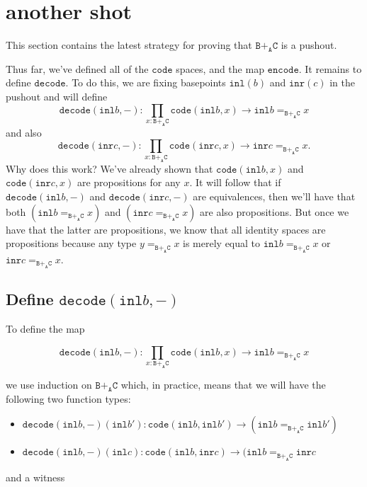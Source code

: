 \message{ !name(notes.tex)}\documentclass[12pt]{amsart}
\newcommand{\from}{\colon}
\newcommand{\type}[1]{\mathtt{#1}}
\newcommand{\tin}{\colon}
\newcommand{\A}{\type{A}}
\newcommand{\B}{\type{B}}
\newcommand{\C}{\type{C}}
\newcommand{\BAC}{\B +_{\A} \C}
\newcommand{\inl}{\type{inl}}
\newcommand{\inr}{\type{inr}}
\newcommand{\code}{\type{code}}
\newcommand{\encode}{\type{encode}}
\newcommand{\decode}{\type{decode}}
\theoremstyle{remark}
\theoremstyle{definition}
\begin{document}
\pagebreak


\section{another shot}

This section contains the latest strategy for proving that \( \BAC \)
is a pushout.

Thus far, we've defined all of the \( \code \) spaces, and the map \(
\encode \).  It remains to define \( \decode \). To do this, we are
fixing basepoints \( \inl (b) \) and \( \inr (c) \) in the pushout
and will define
\[
  \decode ( \inl b , - ) \from
  \prod\limits_{x \tin \BAC} \code ( \inl b , x ) \to
  \inl b =_{\BAC} x
\]
and also 
\[
  \decode ( \inr c , - ) \from
  \prod\limits_{x \tin \BAC} \code ( \inr c , x ) \to
  \inr c =_{\BAC} x.
\]
Why does this work?  We've already shown that \( \code ( \inl b , x ) \)
and \( \code ( \inr c , x ) \) are propositions for any \( x \).  It
will follow that if \( \decode (\inl b , - ) \) and
\( \decode ( \inr c , - ) \) are equivalences, then we'll have that
both \( (\inl b =_{\BAC} x ) \) and \( ( \inr c =_{\BAC} x ) \) are
also propositions. But once we have that the latter are propositions,
we know that all identity spaces are propositions because any type
\( y =_{\BAC} x \) is merely equal to \( \inl b =_{\BAC} x \) or
\( \inr c =_{\BAC} x \).

\subsection{Define $ \decode ( \inl b , - ) $} %

To define the map

\begin{equation} \label{eq:decode-b-blank}
  \decode ( \inl b , - )
  \from
  \prod\limits_{x \tin \BAC} \code ( \inl b , x )
  \to
  \inl b =_{\BAC} x
\end{equation}

we use induction on \( \BAC \) which, in practice, means that we will
have the following two function types:
%
\begin{itemize}
\item
  \( \decode ( \inl b , - ) ( \inl b' )
  \from
  \code (\inl b , \inl b')
  \to
  ( \inl b =_{\BAC} \inl b' ) \)
\item
  \( \decode ( \inl b , - ) ( \inl c )
  \from
  \code ( \inl b , \inr c )
  \to
  ( \inl b =_{\BAC} \inr c \) 
\end{itemize}
%
and a witness
\end{document}
